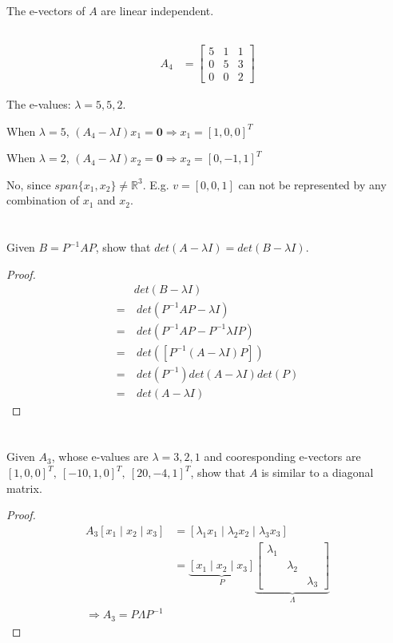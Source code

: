 \documentclass{article}
\theoremstyle{definition} %
\newcommand{\RR}{\mathbb{R}}
\begin{document}
The e-vectors of $A$ are linear independent.

\subsection{}

\begin{align*}
	A_4 &= 
	\begin{bmatrix}
		5 & 1 & 1\\
		0 & 5 & 3\\
		0 & 0 & 2
	\end{bmatrix}
\end{align*}

The e-values: $\lambda = 5, 5, 2$.

When $\lambda=5$,
$
(A_4 - \lambda I)x_1 = \mathbf 0 \Rightarrow x_1 = [1, 0, 0]^T
$

When $\lambda=2$,
$
(A_4 - \lambda I)x_2 = \mathbf 0 \Rightarrow x_2 = [0, -1, 1]^T
$

No, since $span\{x_1, x_2\} \neq \RR^3$. E.g. $v = [0, 0, 1]$ can not be represented by any combination of $x_1$ and $x_2$.

\section{}
Given $ B = P^{-1}AP$, show that $det(A-\lambda I) = det(B-\lambda I)$.

\begin{proof}
	\begin{align*}
		&det(B - \lambda I)\\
		=&\ det(P^{-1}AP - \lambda I)\\
		=&\ det(P^{-1}AP - P^{-1} \lambda I P)\\
		=&\ det(\left[P^{-1}(A - \lambda I) P\right])\\
		=&\ det(P^{-1})det(A - \lambda I)det(P)\\
		=&\ det(A - \lambda I)
	\end{align*}
\end{proof}

\section{}
Given $A_3$, whose e-values are $\lambda = 3, 2, 1$ and cooresponding e-vectors are $[1, 0, 0]^T,\ [-10, 1, 0]^T,\ [20, -4, 1]^T$, show that $A$ is similar to a diagonal matrix.

\begin{proof}
	\begin{align*}
		A_3 [x_1 \mid x_2 \mid x_3] &= [\lambda_1 x_1 \mid \lambda_2 x_2 \mid \lambda_3 x_3]\\
		&= 
		\underbrace{[x_1 \mid x_2 \mid x_3]}_P
		\underbrace{\begin{bmatrix}
			\lambda_1 & & \\
			& \lambda_2 & \\
			& & \lambda_3
		\end{bmatrix}
		}_\Lambda\\
		\Rightarrow A_3 = P\Lambda P^{-1}
	\end{align*}
\end{proof}
\end{document}
